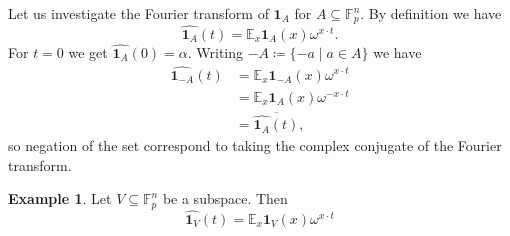 \documentclass{report}
\theoremstyle{definition}
\theoremstyle{plain}
\theoremstyle{definition}
\newtheorem{eg}[thm]{Example}
\begin{document}
	Let us investigate the Fourier transform of $\mathbf{1}_A$ for $A\subseteq \mathbb{F}_p^n$. By definition we have
	\[
		\widehat{\mathbf{1}_A}(t) = \mathbb{E}_{x}\mathbf{1}_A(x)\omega^{x\cdot t}.
	\]
	For $t =0$ we get $\widehat{\mathbf{1}_A}(0) = \alpha$. Writing $-A \coloneqq \{-a\mid a\in A\}$ we have 
	\begin{align*}
		\widehat{\mathbf{1}_{-A}}(t) &= \mathbb{E}_{x}\mathbf{1}_{-A}(x)\omega^{x\cdot t}\\
		&=\mathbb{E}_{x}\mathbf{1}_{A}(x)\omega^{-x\cdot t}\\
		&= \overline{\widehat{\mathbf{1}_A}(t)},
	\end{align*}
	so negation of the set correspond to taking the complex conjugate of the Fourier transform.
	\begin{eg}
		Let $V \subseteq \mathbb{F}_p^n$ be a subspace. Then
		\[
			\widehat{\mathbf{1}_V}(t) = \mathbb{E}_x \mathbf{1}_V(x)\omega^{x\cdot t}
		\]
	\end{eg}
\end{document}

